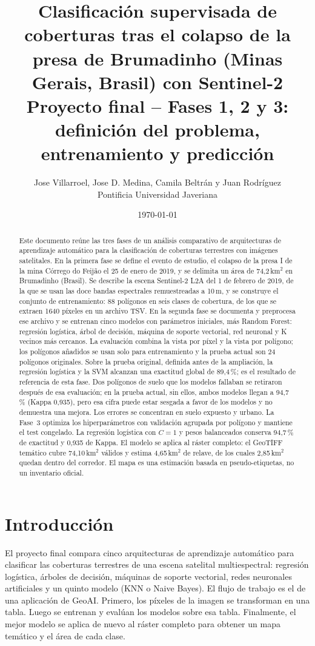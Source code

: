 \documentclass{article}
\title{Clasificación supervisada de coberturas tras el colapso de la presa de Brumadinho (Minas Gerais, Brasil) con Sentinel-2\\[0.5em]
\large Proyecto final -- Fases 1, 2 y 3: definición del problema, entrenamiento y predicción}
\author{Jose Villarroel, Jose D. Medina, Camila Beltrán y Juan Rodríguez\\Pontificia Universidad Javeriana}
\date{\today}
\begin{document}
\setlength{\emergencystretch}{3em}

\maketitle

\begin{abstract}
Este documento reúne las tres fases de un análisis comparativo de arquitecturas de aprendizaje automático para la clasificación de coberturas terrestres con imágenes satelitales. En la primera fase se define el evento de estudio, el colapso de la presa I de la mina Córrego do Feijão el 25 de enero de 2019, y se delimita un área de 74{,}2\,km$^2$ en Brumadinho (Brasil). Se describe la escena Sentinel-2 L2A del 1 de febrero de 2019, de la que se usan las doce bandas espectrales remuestreadas a 10\,m, y se construye el conjunto de entrenamiento: 88 polígonos en seis clases de cobertura, de los que se extraen 1640 píxeles en un archivo TSV. En la segunda fase se documenta y preprocesa ese archivo y se entrenan cinco modelos con parámetros iniciales, más Random Forest: regresión logística, árbol de decisión, máquina de soporte vectorial, red neuronal y K vecinos más cercanos. La evaluación combina la vista por píxel y la vista por polígono; los polígonos añadidos se usan solo para entrenamiento y la prueba actual son 24 polígonos originales. Sobre la prueba original, definida antes de la ampliación, la regresión logística y la SVM alcanzan una exactitud global de 89{,}4\,\%; es el resultado de referencia de esta fase. Dos polígonos de suelo que los modelos fallaban se retiraron después de esa evaluación; en la prueba actual, sin ellos, ambos modelos llegan a 94{,}7\,\% (Kappa 0{,}935), pero esa cifra puede estar sesgada a favor de los modelos y no demuestra una mejora. Los errores se concentran en suelo expuesto y urbano. La Fase~3 optimiza los hiperparámetros con validación agrupada por polígono y mantiene el test congelado. La regresión logística con $C=1$ y pesos balanceados conserva 94{,}7\,\% de exactitud y 0{,}935 de Kappa. El modelo se aplica al ráster completo: el GeoTIFF temático cubre 74{,}10\,km$^2$ válidos y estima 4{,}65\,km$^2$ de relave, de los cuales 2{,}85\,km$^2$ quedan dentro del corredor. El mapa es una estimación basada en pseudo-etiquetas, no un inventario oficial.
\end{abstract}

\section{Introducción}
El proyecto final compara cinco arquitecturas de aprendizaje automático para clasificar las coberturas terrestres de una escena satelital multiespectral: regresión logística, árboles de decisión, máquinas de soporte vectorial, redes neuronales artificiales y un quinto modelo (KNN o Naive Bayes). El flujo de trabajo es el de una aplicación de GeoAI. Primero, los píxeles de la imagen se transforman en una tabla. Luego se entrenan y evalúan los modelos sobre esa tabla. Finalmente, el mejor modelo se aplica de nuevo al ráster completo para obtener un mapa temático y el área de cada clase.
\end{document}
